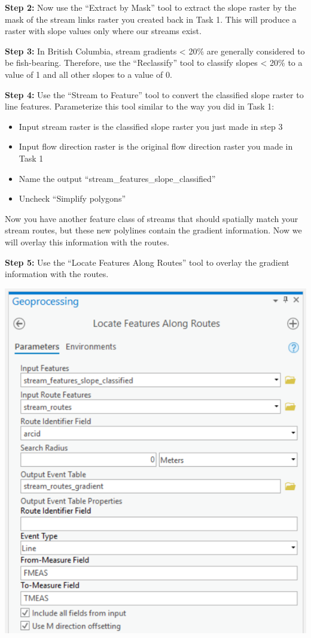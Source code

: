 \documentclass[
]{book}
\begin{document}
\textbf{Step 2:} Now use the ``Extract by Mask'' tool to extract the slope raster by the mask of the stream links raster you created back in Task 1. This will produce a raster with slope values only where our streams exist.

\textbf{Step 3:} In British Columbia, stream gradients \textless{} 20\% are generally considered to be fish-bearing. Therefore, use the ``Reclassify'' tool to classify slopes \textless{} 20\% to a value of 1 and all other slopes to a value of 0.

\textbf{Step 4:} Use the ``Stream to Feature'' tool to convert the classified slope raster to line features. Parameterize this tool similar to the way you did in Task 1:

\begin{itemize}
\item
  Input stream raster is the classified slope raster you just made in step 3
\item
  Input flow direction raster is the original flow direction raster you made in Task 1
\item
  Name the output ``stream\_features\_slope\_classified''
\item
  Uncheck ``Simplify polygons''
\end{itemize}

Now you have another feature class of streams that should spatially match your stream routes, but these new polylines contain the gradient information. Now we will overlay this information with the routes.

\textbf{Step 5:} Use the ``Locate Features Along Routes'' tool to overlay the gradient information with the routes.

\includegraphics[width=0.5\linewidth]{images/02-locate-features-along-routes}
\end{document}
